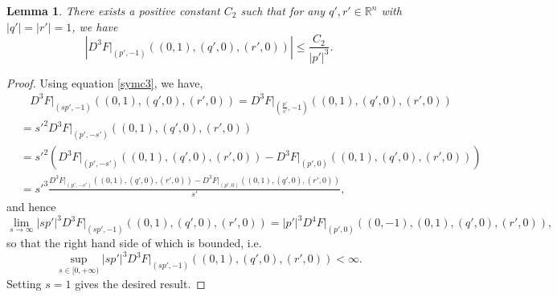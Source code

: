 \documentclass[12pt]{article}
\numberwithin{equation}{section}
\theoremstyle{plain}
\newtheorem{lemma}[theorem]{Lemma}
\theoremstyle{definition}
\theoremstyle{remark}
\begin{document}
\begin{lemma} \label{lem:2.2}
There exists a positive constant $C_2$ such that for any $q',r'\in \mathbb{R}^n$ with $|q'|=|r'|=1$, we have
\begin{equation}
  \left|  D^3 F\Big|_{(p',-1)} ((0,1),(q',0),(r',0) ) \right| \leq \frac{C_2}{|p'|^3}.
\end{equation}
\end{lemma}
\begin{proof}
Using equation \eqref{symc3}, we have,
\begin{equation*}
\begin{split}
   & \ \ \ \  D^3 F\Big|_{(sp',-1)} ((0,1),(q',0),(r',0) ) = D^3 F\Big|_{(\frac{p'}{s'},-1)} ((0,1),(q',0),(r',0) ) \\
   & = s'^2 D^3 F\Big|_{(p', -s')} ((0,1),(q',0),(r',0) ) \\
   & = s'^2 \left(  D^3 F\Big|_{(p', -s')} ((0,1),(q',0),(r',0) ) -  D^3 F\Big|_{(p', 0)} ((0,1),(q',0),(r',0) ) \right) \\
   & = s'^3 \frac{D^3 F\Big|_{(p', -s')} ((0,1),(q',0),(r',0) ) -  D^3 F\Big|_{(p', 0)} ((0,1),(q',0),(r',0) ) }{s'},
\end{split}
\end{equation*}
and hence 
\begin{equation*}
    \lim_{s\rightarrow \infty} |sp'|^3 D^3 F\Big|_{(sp',-1)} ((0,1),(q',0),(r',0) ) = |p'|^3 D^4 F\Big|_{(p', 0)} ((0,-1),(0,1),(q',0),(r',0)),
\end{equation*}
so that the right hand side of which is bounded, i.e. 
\begin{equation*}
    \sup_{s\in[0,+\infty)} |sp'|^3 D^3 F\Big|_{(sp',-1)} ((0,1),(q',0),(r',0) ) < \infty.
\end{equation*}
Setting $s=1$ gives the desired result.
\end{proof}
\end{document}
